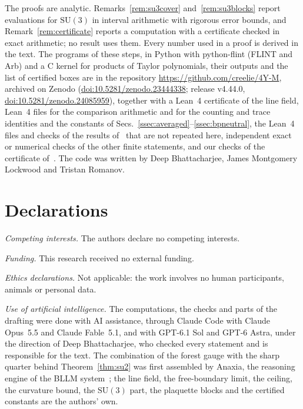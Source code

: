 \documentclass[aps,prd,twocolumn,superscriptaddress,nofootinbib,longbibliography,floatfix,amsmath,amssymb,10pt]{revtex4-2}
\theoremstyle{definition}
\theoremstyle{remark}
\newcommand{\SU}{\mathrm{SU}}
\begin{document}
The proofs are analytic. Remarks~\ref{rem:su3cover} and~\ref{rem:su3blocks}
report evaluations for $\SU(3)$ in interval arithmetic with rigorous error
bounds, and Remark~\ref{rem:certificate} reports a computation with a
certificate checked in exact arithmetic; no result uses them. Every number
used in a proof is derived in the text. The programs of these steps, in
Python with python-flint (FLINT and Arb) and a C kernel for products of
Taylor polynomials, their outputs and the list of certified boxes are in the
repository \url{https://github.com/creelie/4Y-M}, archived on Zenodo
(\href{https://doi.org/10.5281/zenodo.23444338}{doi:10.5281/zenodo.23444338};
release v4.44.0,
\href{https://doi.org/10.5281/zenodo.24085959}{doi:10.5281/zenodo.24085959}), together
with a Lean~4 certificate of the line field, Lean~4 files for the
comparison arithmetic and for the counting and trace identities and the
constants of Secs.~\ref{ssec:averaged}--\ref{ssec:bpneutral}, the Lean~4
files and checks of the results of~\cite{BBLR26} that are not repeated
here, independent exact or numerical checks of the other finite
statements, and our checks of the certificate of~\cite{Rom26}. The code was
written by Deep Bhattacharjee, James Montgomery Lockwood and Tristan
Romanov.

\section*{Declarations}

\emph{Competing interests.} The authors declare no competing interests.

\emph{Funding.} This research received no external funding.

\emph{Ethics declarations.} Not applicable: the work involves no human
participants, animals or personal data.

\emph{Use of artificial intelligence.} The computations, the checks and parts
of the drafting were done with AI assistance, through Claude Code with Claude
Opus~5.5 and Claude Fable~5.1, and with GPT-6.1 Sol and GPT-6 Astra, under the
direction of Deep Bhattacharjee, who checked every statement and is
responsible for the text. The combination of the forest gauge with the sharp
quarter behind Theorem~\ref{thm:su2} was first assembled by Anaxia, the
reasoning engine of the BLLM system~\cite{Bha26,Bha26b}; the line field, the
free-boundary limit, the ceiling, the curvature bound, the $\SU(3)$ part, the
plaquette blocks and the certified constants are the authors' own.
\end{document}
